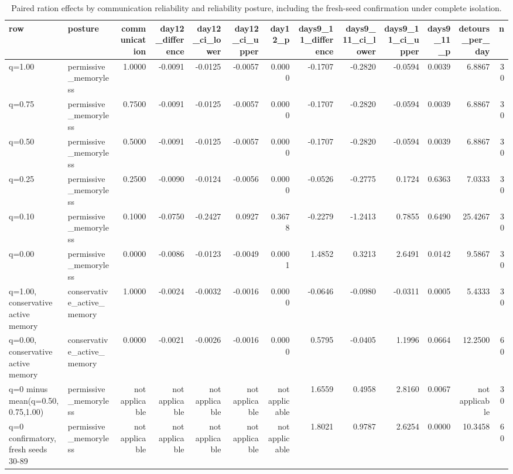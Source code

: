 \begin{table}
\caption{Paired ration effects by communication reliability and reliability posture, including the fresh-seed confirmation under complete isolation.}
\label{tab:ration-connectivity}
\begin{tabular}{llrrrrrrrrrrr}
\toprule
row & posture & communication & day12_difference & day12_ci_lower & day12_ci_upper & day12_p & days9_11_difference & days9_11_ci_lower & days9_11_ci_upper & days9_11_p & detours_per_day & n \\
\midrule
q=1.00 & permissive_memoryless & 1.0000 & -0.0091 & -0.0125 & -0.0057 & 0.0000 & -0.1707 & -0.2820 & -0.0594 & 0.0039 & 6.8867 & 30 \\
q=0.75 & permissive_memoryless & 0.7500 & -0.0091 & -0.0125 & -0.0057 & 0.0000 & -0.1707 & -0.2820 & -0.0594 & 0.0039 & 6.8867 & 30 \\
q=0.50 & permissive_memoryless & 0.5000 & -0.0091 & -0.0125 & -0.0057 & 0.0000 & -0.1707 & -0.2820 & -0.0594 & 0.0039 & 6.8867 & 30 \\
q=0.25 & permissive_memoryless & 0.2500 & -0.0090 & -0.0124 & -0.0056 & 0.0000 & -0.0526 & -0.2775 & 0.1724 & 0.6363 & 7.0333 & 30 \\
q=0.10 & permissive_memoryless & 0.1000 & -0.0750 & -0.2427 & 0.0927 & 0.3678 & -0.2279 & -1.2413 & 0.7855 & 0.6490 & 25.4267 & 30 \\
q=0.00 & permissive_memoryless & 0.0000 & -0.0086 & -0.0123 & -0.0049 & 0.0001 & 1.4852 & 0.3213 & 2.6491 & 0.0142 & 9.5867 & 30 \\
q=1.00, conservative active memory & conservative_active_memory & 1.0000 & -0.0024 & -0.0032 & -0.0016 & 0.0000 & -0.0646 & -0.0980 & -0.0311 & 0.0005 & 5.4333 & 30 \\
q=0.00, conservative active memory & conservative_active_memory & 0.0000 & -0.0021 & -0.0026 & -0.0016 & 0.0000 & 0.5795 & -0.0405 & 1.1996 & 0.0664 & 12.2500 & 60 \\
q=0 minus mean(q=0.50,0.75,1.00) & permissive_memoryless & not applicable & not applicable & not applicable & not applicable & not applicable & 1.6559 & 0.4958 & 2.8160 & 0.0067 & not applicable & 30 \\
q=0 confirmatory, fresh seeds 30-89 & permissive_memoryless & not applicable & not applicable & not applicable & not applicable & not applicable & 1.8021 & 0.9787 & 2.6254 & 0.0000 & 10.3458 & 60 \\
\bottomrule
\end{tabular}
\end{table}
